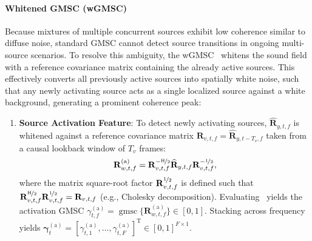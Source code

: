 \documentclass[lettersize,journal]{IEEEtran}
\begin{document}
\paragraph{Whitened GMSC (wGMSC)}
Because mixtures of multiple concurrent sources exhibit low coherence similar to diffuse noise, standard \gls{GMSC} cannot detect source transitions in ongoing multi-source scenarios. To resolve this ambiguity, the \gls{wGMSC}~\cite{gode2026dnnbased} whitens the sound field with a reference covariance matrix containing the already active sources. This effectively converts all previously active sources into spatially white noise, such that any newly activating source acts as a single localized source against a white background, generating a prominent coherence peak:
\begin{enumerate}
  \item \textbf{Source Activation Feature}: To detect newly activating sources, $\widehat{\mathbf{R}}_{y,t,f}$ is whitened against a reference covariance matrix $\mathbf{R}_{v,t,f} = \widehat{\mathbf{R}}_{y,t-T_v,f}$ taken from a causal lookback window of $T_v$ frames:
  \begin{align}
    \mathbf{R}_{w,t,f}^{(\mathrm{a})} = \mathbf{R}_{v,t,f}^{-\nicefrac{\mathrm{H}}{2}} \widehat{\mathbf{R}}_{y,t,f} \mathbf{R}_{v,t,f}^{-\nicefrac{1}{2}},
    \label{eq:whitening_act}
  \end{align}
  where the matrix square-root factor $\mathbf{R}_{v,t,f}^{\nicefrac{1}{2}}$ is defined such that $\mathbf{R}_{v,t,f}^{\nicefrac{\mathrm{H}}{2}}\mathbf{R}_{v,t,f}^{\nicefrac{1}{2}} = \mathbf{R}_{v,t,f}$ (e.g., Cholesky decomposition). Evaluating~ yields the activation \gls{GMSC} $\gamma_{t,f}^{(\mathrm{a})} = \operatorname{gmsc}\{\mathbf{R}_{w,t,f}^{(\mathrm{a})}\} \in [0, 1]$. Stacking across frequency yields $\bm{\gamma}_{t}^{(\mathrm{a})} = [\gamma_{t,1}^{(\mathrm{a})}, \dots, \gamma_{t,F}^{(\mathrm{a})}]^{\mathrm{T}} \in [0, 1]^{F \times 1}$.
  

\end{enumerate}
\end{document}
